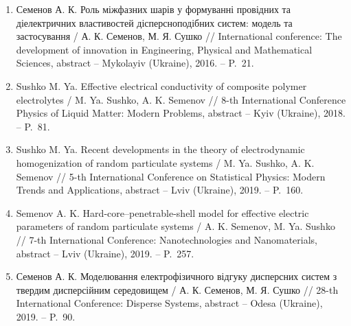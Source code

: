 \begin{enumerate}[leftmargin=0.8cm]
	\item Семенов А. К. Роль міжфазних шарів у формуванні провідних та діелектричних властивостей дісперсноподібних систем: модель та застосування / А. К. Семенов, М. Я. Сушко // International conference: The development of innovation in Engineering, Physical and Mathematical Sciences, abstract -- Mykolayiv (Ukraine), 2016. -- P.~21.
	
	\item Sushko M. Ya. Effective electrical conductivity of composite polymer elec\-trolytes / M. Ya. Sushko, A. K. Semenov // 8-th International  Conf\-erence Physics  of  Liquid  Matter: Modern Problems, abstract -- Kyiv (Ukraine), 2018. -- P.~81.
	
	\item Sushko M. Ya. Recent developments in the theory of electrodynamic homogenization of random particulate systems / M. Ya. Sushko, A. K. Semenov // 5-th International Conference on Statistical Physics: Modern Trends and Applications, abstract -- Lviv (Ukraine), 2019. -- P.~160.
	
	\item Semenov A. K. Hard-core--penetrable-shell model for effective electric para\-meters of random particulate systems / A. K. Semenov, M. Ya. Sushko // 7-th International Conference: Nanotechnologies and Nanomaterials, abstract -- Lviv (Ukraine), 2019. -- P.~257.
	
	\item Семенов А. К. Моделювання електрофізичного відгуку дисперсних систем з твердим дисперсійним середовищем / А. К. Семенов, М. Я. Сушко // 28-th International Conference: Disperse Systems, abstract -- Odesa (Ukraine), 2019. -- P.~90.
\end{enumerate}